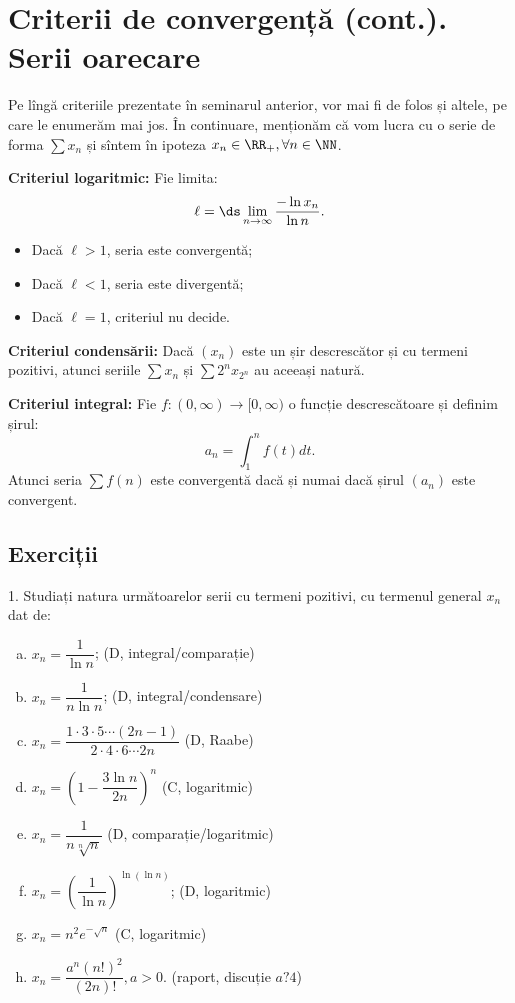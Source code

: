 \chapter{Criterii de convergență (cont.). Serii oarecare}

Pe lîngă criteriile prezentate în seminarul anterior, vor mai fi de folos
și altele, pe care le enumerăm mai jos. În continuare, menționăm că
vom lucra cu o serie de forma $ \sum x_n $ și sîntem în ipoteza
$ x_n \in \RR_+, \forall n \in \NN $.


\textbf{Criteriul logaritmic:} Fie limita:
\[
  \ell = \ds\lim_{n \to \infty} \dfrac{- \ln x_n}{\ln n}.
\]
\begin{itemize}
    \item Dacă $ \ell > 1 $, seria este convergentă;
    \item Dacă $ \ell < 1 $, seria este divergentă;
    \item Dacă $ \ell = 1 $, criteriul nu decide.
\end{itemize}

\vspace{1cm}

\textbf{Criteriul condensării:} Dacă $ (x_n) $ este un șir
descrescător și cu termeni pozitivi, atunci seriile $ \sum x_n $ și
$ \sum 2^n x_{2^n} $ au aceeași natură.

\vspace{1cm}

\textbf{Criteriul integral:} Fie $ f : (0, \infty) \to [0, \infty) $ o funcție
descrescătoare și definim șirul:
\[
    a_n = \int_1^n f(t) dt.
\]
Atunci seria $ \sum f(n) $ este convergentă dacă și numai dacă șirul $ (a_n) $ este
convergent.

\section{Exerciții}

1. Studiați natura următoarelor serii cu termeni pozitivi, cu termenul
general $ x_n $ dat de:
\begin{enumerate}[(a)]
    \item $ x_n = \dfrac{1}{\ln n} $; \hfill(D, integral/comparație)
    \item $ x_n = \dfrac{1}{n \ln n} $; \hfill(D, integral/condensare)
    \item $ x_n = \dfrac{1 \cdot 3 \cdot 5 \cdots (2n - 1)}{2 \cdot 4 \cdot 6 \cdots 2n} $ \hfill(D, Raabe)
    \item $ x_n = \left( 1 - \dfrac{3 \ln n}{2n} \right)^n $ \hfill(C, logaritmic)
    \item $ x_n = \dfrac{1}{n \sqrt[n]{n}} $ \hfill(D, comparație/logaritmic)
    \item $ x_n = \left( \dfrac{1}{\ln n} \right)^{\ln(\ln n)} $; \hfill(D, logaritmic)
    \item $ x_n = n^2 e^{-\sqrt{n}} $ \hfill(C, logaritmic)
    \item $ x_n = \dfrac{a^n (n!)^2}{(2n)!}, a > 0. $ \hfill(raport, discuție $ a ? 4 $)
\end{enumerate}


